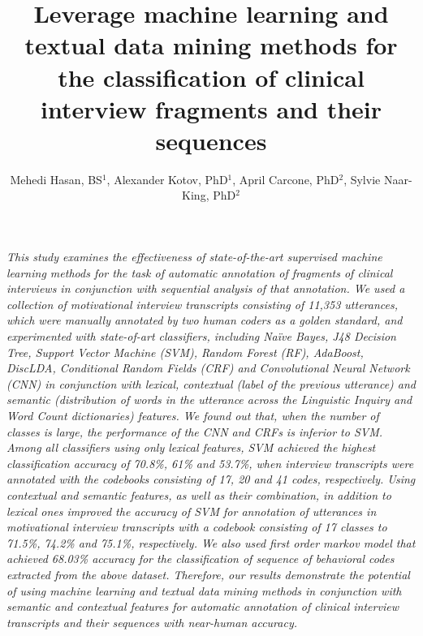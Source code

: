 \documentclass{amia}
\begin{document}
\title{Leverage machine learning and textual data mining methods for the classification of clinical interview fragments and their sequences}

\author{Mehedi Hasan, BS$^{1}$, Alexander Kotov, PhD$^{1}$, April Carcone, PhD$^{2}$, Sylvie Naar-King, PhD$^{2}$}


\maketitle

\textit{This study examines the effectiveness of state-of-the-art supervised machine learning methods for the task of automatic annotation of fragments of clinical interviews in conjunction with sequential analysis of that annotation. We used a collection of motivational interview transcripts consisting of 11,353 utterances, which were manually annotated by two human coders as a golden standard, and experimented with state-of-art classifiers, including Na\"{i}ve Bayes, J48 Decision Tree, Support Vector Machine (SVM), Random Forest (RF), AdaBoost, DiscLDA, Conditional Random Fields (CRF) and Convolutional Neural Network (CNN) in conjunction with lexical, contextual (label of the previous utterance) and semantic (distribution of words in the utterance across the Linguistic Inquiry and Word Count dictionaries) features. We found out that, when the number of classes is large, the performance of the CNN and CRFs is inferior to SVM. Among all classifiers using only lexical features, SVM achieved the highest classification accuracy of 70.8\%, 61\% and 53.7\%, when interview transcripts were annotated with the codebooks consisting of 17, 20 and 41 codes, respectively. Using contextual and semantic features, as well as their combination, in addition to lexical ones improved the accuracy of SVM for annotation of utterances in motivational interview transcripts with a codebook consisting of 17 classes to 71.5\%, 74.2\% and 75.1\%, respectively. We also used first order markov model that achieved 68.03\% accuracy for the classification of sequence of behavioral codes extracted from the above dataset. Therefore, our results demonstrate the potential of using machine learning  and textual data mining methods in conjunction with semantic and contextual features for automatic annotation of clinical interview transcripts  and their sequences with near-human accuracy.}
\end{document}
